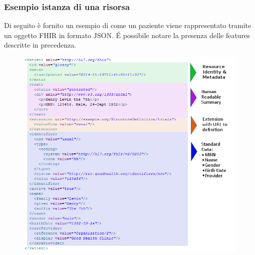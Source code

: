 \documentclass[a4paper]{article}
\begin{document}
\subsubsection*{Esempio istanza di una risorsa}
Di seguito è fornito un esempio di come un paziente viene rappresentato tramite un oggetto FHIR in formato JSON.
\'E possibile notare la presenza delle features descritte in precedenza.
\begin{figure}[H]
    \centering
    \includegraphics[width=1 \textwidth]{figures/esempio paziente.png}
    \label{fig:esempioPaziente}
\end{figure}
\end{document}
